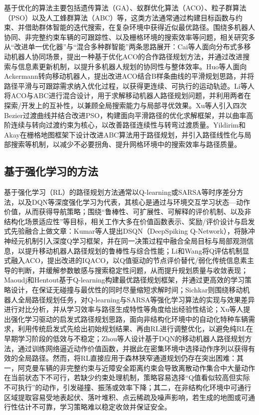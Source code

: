 \documentclass{iopjournal}
\begin{document}
基于优化的算法主要包括遗传算法（GA）、蚁群优化算法（ACO）、粒子群算法（PSO）以及人工蜂群算法（ABC）等，这类方法通常通过构建目标函数与约束、并借助群体智能的迭代搜索，在复杂环境中获得近似最优路径。围绕多机器人协同、非完整约束车辆的可跟踪性、以及栅格环境的搜索效率等问题，相关研究多从``改进单一优化器''与``混合多种群智能''两条思路展开：Cai等人\cite{cai2024cooperative}面向分布式多移动机器人协同场景，提出一种基于优化ACO的合作路径规划方法，并通过改进搜索与信息素更新机制，以提升多机器人规划的协同性与整体效率。Huo等人\cite{huo2024smooth}面向Ackermann转向移动机器人，提出改进ACO结合B样条曲线的平滑规划思路，并将路径平滑与可跟踪需求纳入优化过程，以获得更连续、可执行的运动轨迹。Li等人\cite{li2023mixing}将ACO与ABC进行混合设计，用于求解移动机器人路径规划问题，并利用两者在探索/开发上的互补性，以兼顾全局搜索能力与局部寻优效果。Xu等人\cite{xu2022quartic}引入四次Bezier过渡曲线并结合改进PSO，构建面向平滑路径的优化求解框架，并以曲率高阶连续与转向过渡约束为核心，以改善路径连续性与转弯过渡质量。Yildirim和Akay\cite{yildirim2025efficient}在栅格地图框架下设计改进ABC算法用于路径规划，并引入路径线性化与局部搜索等机制，以减少不必要拐角、提升网格环境中的搜索效率与路径质量。

\subsection{基于强化学习的方法}

基于强化学习（RL）的路径规划方法通常以Q-learning或SARSA等时序差分方法，以及DQN等深度强化学习为代表，其核心是通过与环境交互学习状态---动作价值，从而获得导航策略；围绕``鲁棒性、可扩展性、可解释的评价机制、以及非结构化场景适应性''等目标，相关工作大多在价值函数表示、奖励/评价设计与启发式先验融合上做文章：Kumar等人\cite{kumar2025dsqn}提出DSQN（DeepSpiking Q-Network），将脉冲神经元机制引入深度Q学习框架，并在同一决策过程中融合全局目标与局部观测信息，以提升移动机器人路径规划的鲁棒性与综合性能；Li和Wang\cite{li2025iqaco}将Q评估机制显式融入ACO，提出改进的IQACO，以Q值驱动的节点评价替代/弱化传统信息素主导的判断，并缓解参数敏感与搜索稳定性问题，从而提升规划质量与收敛表现；Maoudj和Hentout\cite{maoudj2020optimal}基于Q-learning构建最优路径规划框架，并通过更高效的学习策略设计，在保证无碰撞与最优性的同时尽量缩短求解时间；Sichkar\cite{sichkar2019reinforcement}则围绕移动机器人全局路径规划任务，对Q-learning与SARSA等强化学习算法的实现与效果差异进行对比分析，并从学习效率与路径生成特性等角度给出经验性结论；Xu等人\cite{xu2026rl}提出强化学习驱动的启发式路径规划思路，面向非结构化环境中的自动化特种车辆需求，利用传统启发式先给出初始规划结果、再由RL进行调整优化，以避免纯RL在早期学习阶段的低效与不稳定；Zhou等人\cite{zhou2018dqn}设计基于DQN的移动机器人路径规划方法，通过训练网络逼近动作价值函数，并据此在密集环境中选择动作序列以获得有效的全局路径。然而，将RL直接应用于森林狭窄通道规划仍存在突出困难：其一，阿克曼车辆的非完整约束与近障安全距离约束会导致离散动作集合中大量动作在当前状态下不可行，若缺少约束处理机制，策略容易选择``Q值看似较高但实际不可执行''的动作，引发碰撞、振荡或效率下降；其二，在非结构化环境中可通行区域提取容易受地表起伏、落叶堆积、点云稀疏及噪声影响，若生成的地图或可通行性估计不可靠，学习策略难以稳定收敛并保证安全。
\end{document}
